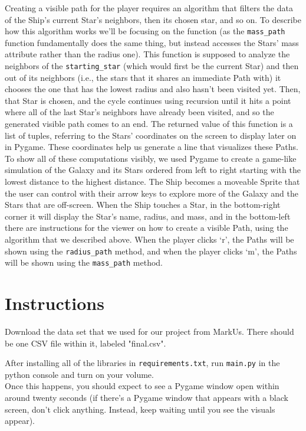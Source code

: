 \documentclass[fontsize=11pt]{article}
\begin{document}
Creating a visible path for the player requires an algorithm that filters the data of the Ship’s current Star’s neighbors, then its chosen star, and so on. To describe how this algorithm works we’ll be focusing on the  function (as the \texttt{mass\_path} function fundamentally does the same thing, but instead accesses the Stars’ mass attribute rather than the radius one). This function is supposed to analyze the neighbors of the \texttt{starting\_star} (which would first be the current Star) and then out of its neighbors (i.e., the stars that it shares an immediate Path with) it chooses the one that has the lowest radius and also hasn’t been visited yet. Then, that Star is chosen, and the cycle continues using recursion until it hits a point where all of the last Star’s neighbors have already been visited, and so the generated visible path comes to an end. The returned value of this function is a list of tuples, referring to the Stars' coordinates on the screen to display later on in Pygame. These coordinates help us generate a line that visualizes these Paths.\\

To show all of these computations visibly, we used Pygame to create a game-like simulation of the Galaxy and its Stars ordered from left to right starting with the lowest distance to the highest distance. The Ship becomes a moveable Sprite that the user can control with their arrow keys to explore more of the Galaxy and the Stars that are off-screen. When the Ship touches a Star, in the bottom-right corner it will display the Star’s name, radius, and mass, and in the bottom-left there are instructions for the viewer on how to create a visible Path, using the algorithm that we described above. When the player clicks ‘r’, the Paths will be shown using the \texttt{radius\_path} method, and when the player clicks ‘m’, the Paths will be shown using the \texttt{mass\_path} method.


\section*{Instructions}
Download the data set that we used for our project from MarkUs. There should be one CSV file within it, labeled "final.csv".

After installing all of the libraries in \texttt{requirements.txt}, run \texttt{main.py} in the python console and turn on your volume.\\

Once this happens, you should expect to see a Pygame window open within around twenty seconds (if there's a Pygame window that appears with a black screen, don't click anything. Instead, keep waiting until you see the visuals appear). \\
\end{document}
